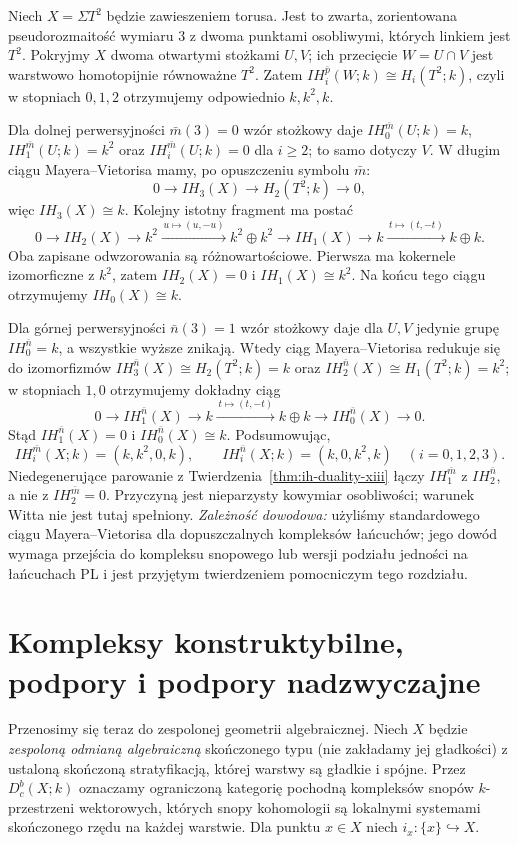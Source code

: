 \begin{przyklad}
\label{ex:suspension-torus-xiii}
Niech $X=\Sigma T^2$ będzie zawieszeniem torusa.
Jest to zwarta, zorientowana pseudorozmaitość wymiaru $3$
z dwoma punktami osobliwymi, których linkiem jest $T^2$.
Pokryjmy $X$ dwoma otwartymi stożkami $U,V$; ich
przecięcie $W=U\cap V$ jest warstwowo homotopijnie
równoważne $T^2$. Zatem
$IH_i^{\bar p}(W;k)\cong H_i(T^2;k)$, czyli
w stopniach $0,1,2$ otrzymujemy odpowiednio $k,k^2,k$.

Dla dolnej perwersyjności $\bar m(3)=0$ wzór
stożkowy daje
$IH_0^{\bar m}(U;k)=k$,
$IH_1^{\bar m}(U;k)=k^2$ oraz
$IH_i^{\bar m}(U;k)=0$ dla $i\ge2$;
to samo dotyczy $V$. W długim ciągu
Mayera--Vietorisa mamy, po opuszczeniu
symbolu $\bar m$:
\[
0\longrightarrow IH_3(X)\longrightarrow
H_2(T^2;k)\longrightarrow0,
\]
więc $IH_3(X)\cong k$. Kolejny istotny
fragment ma postać
\[
0\longrightarrow IH_2(X)\longrightarrow
k^2\xrightarrow{\,u\mapsto(u,-u)\,}k^2\oplus k^2
\longrightarrow IH_1(X)\longrightarrow
k\xrightarrow{\,t\mapsto(t,-t)\,}k\oplus k.
\]
Oba zapisane odwzorowania są różnowartościowe.
Pierwsza ma kokernele izomorficzne z $k^2$,
zatem $IH_2(X)=0$ i $IH_1(X)\cong k^2$.
Na końcu tego ciągu otrzymujemy $IH_0(X)\cong k$.

Dla górnej perwersyjności $\bar n(3)=1$ wzór
stożkowy daje dla $U,V$ jedynie grupę
$IH_0^{\bar n}=k$, a wszystkie wyższe znikają.
Wtedy ciąg Mayera--Vietorisa redukuje się
do izomorfizmów
$IH_3^{\bar n}(X)\cong H_2(T^2;k)=k$ oraz
$IH_2^{\bar n}(X)\cong H_1(T^2;k)=k^2$;
w stopniach $1,0$ otrzymujemy dokładny ciąg
\[
0\longrightarrow IH_1^{\bar n}(X)
\longrightarrow k\xrightarrow{\,t\mapsto(t,-t)\,}
k\oplus k\longrightarrow IH_0^{\bar n}(X)
\longrightarrow0.
\]
Stąd $IH_1^{\bar n}(X)=0$ i
$IH_0^{\bar n}(X)\cong k$.
Podsumowując,
\[
IH_i^{\bar m}(X;k)=(k,k^2,0,k),\qquad
IH_i^{\bar n}(X;k)=(k,0,k^2,k)
\quad (i=0,1,2,3).
\]
Niedegenerujące parowanie z
Twierdzenia~\ref{thm:ih-duality-xiii} łączy
$IH_1^{\bar m}$ z $IH_2^{\bar n}$,
a nie z $IH_2^{\bar m}=0$.
Przyczyną jest nieparzysty kowymiar osobliwości;
warunek Witta nie jest tutaj spełniony.
\emph{Zależność dowodowa:} użyliśmy standardowego
ciągu Mayera--Vietorisa dla dopuszczalnych kompleksów
łańcuchów; jego dowód wymaga przejścia do
kompleksu snopowego lub wersji podziału jedności
na łańcuchach PL i jest przyjętym twierdzeniem
pomocniczym tego rozdziału.
\end{przyklad}

\section{Kompleksy konstruktybilne, podpory i podpory nadzwyczajne}
Przenosimy się teraz do zespolonej geometrii
algebraicznej. Niech $X$ będzie \emph{zespoloną odmianą
algebraiczną} skończonego typu (nie zakładamy jej
gładkości) z ustaloną skończoną
stratyfikacją, której warstwy są gładkie i spójne.
Przez $D_c^b(X;k)$ oznaczamy ograniczoną kategorię
pochodną kompleksów snopów $k$-przestrzeni wektorowych,
których snopy kohomologii są lokalnymi systemami
skończonego rzędu na każdej warstwie.
Dla punktu $x\in X$ niech $i_x:\{x\}\hookrightarrow X$.

